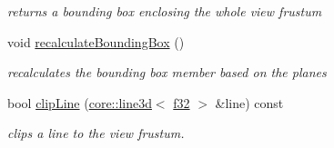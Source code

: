 \begin{DoxyCompactItemize}
\begin{DoxyCompactList}\small\item\em returns a bounding box enclosing the whole view frustum \end{DoxyCompactList}\item 
void \hyperlink{structirr_1_1scene_1_1SViewFrustum_a458eb19a23bcad50da0f9d3163e3621b}{recalculate\+Bounding\+Box} ()\hypertarget{structirr_1_1scene_1_1SViewFrustum_a458eb19a23bcad50da0f9d3163e3621b}{}\label{structirr_1_1scene_1_1SViewFrustum_a458eb19a23bcad50da0f9d3163e3621b}

\begin{DoxyCompactList}\small\item\em recalculates the bounding box member based on the planes \end{DoxyCompactList}\item 
bool \hyperlink{structirr_1_1scene_1_1SViewFrustum_ace0b4c93dcd1d4e6ae50615b457f1851}{clip\+Line} (\hyperlink{classirr_1_1core_1_1line3d}{core\+::line3d}$<$ \hyperlink{namespaceirr_a0277be98d67dc26ff93b1a6a1d086b07}{f32} $>$ \&line) const 
\begin{DoxyCompactList}\small\item\em clips a line to the view frustum. \end{DoxyCompactList}\end{DoxyCompactItemize}
